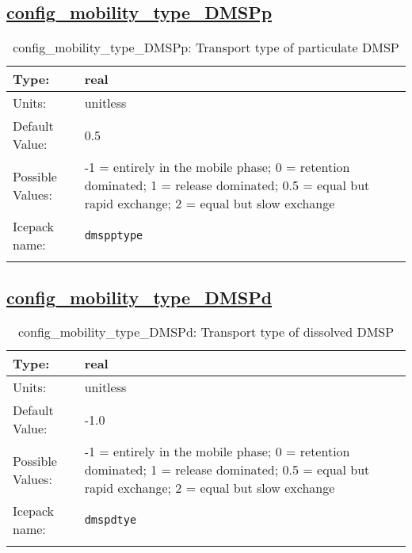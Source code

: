 \subsection[config\_mobility\_type\_DMSPp]{\hyperref[sec:nm_tab_biogeochemistry]{config\_mobility\_type\_DMSPp}}
\label{subsec:nm_sec_config_mobility_type_DMSPp}
\begin{center}
\begin{longtable}{| p{2.0in} || p{4.0in} |}
    \hline
    Type: & real \\
    \hline
    Units: & \si{unitless} \\
    \hline
    Default Value: & 0.5 \\
    \hline
    Possible Values: & -1 = entirely in the mobile phase; 0 = retention dominated; 1 = release dominated; 0.5 = equal but rapid exchange; 2 = equal but slow exchange \\
    \hline
    Icepack name: & \verb+dmspptype+ \\
    \hline
    \caption{config\_mobility\_type\_DMSPp: Transport type of particulate DMSP}
\end{longtable}
\end{center}
\subsection[config\_mobility\_type\_DMSPd]{\hyperref[sec:nm_tab_biogeochemistry]{config\_mobility\_type\_DMSPd}}
\label{subsec:nm_sec_config_mobility_type_DMSPd}
\begin{center}
\begin{longtable}{| p{2.0in} || p{4.0in} |}
    \hline
    Type: & real \\
    \hline
    Units: & \si{unitless} \\
    \hline
    Default Value: & -1.0 \\
    \hline
    Possible Values: & -1 = entirely in the mobile phase; 0 = retention dominated; 1 = release dominated; 0.5 = equal but rapid exchange; 2 = equal but slow exchange \\
    \hline
    Icepack name: & \verb+dmspdtye+ \\
    \hline
    \caption{config\_mobility\_type\_DMSPd: Transport type of dissolved DMSP}
\end{longtable}
\end{center}

